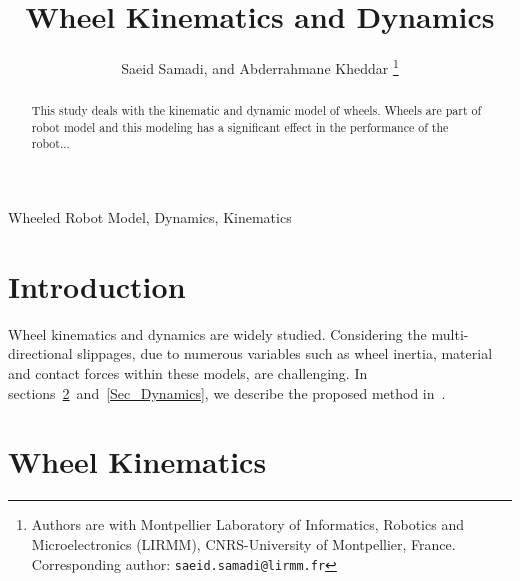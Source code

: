 \documentclass[letterpaper, 10pt, conference]{ieeeconf}
\title{\Large \bf
	Wheel Kinematics and Dynamics}
\author{Saeid Samadi, and Abderrahmane Kheddar
	\thanks{Authors are with Montpellier Laboratory of Informatics,
		Robotics and Microelectronics (LIRMM), CNRS-University of Montpellier, France.
		Corresponding author: {\tt\footnotesize saeid.samadi@lirmm.fr}}
}
\begin{document}
\maketitle
\thispagestyle{empty}
\pagestyle{empty}

\begin{abstract}
	This study deals with the kinematic and dynamic model of wheels. Wheels are part of robot model and this modeling has a significant effect in the performance of the robot...
\end{abstract}

\begin{keywords}
	Wheeled Robot Model, Dynamics, Kinematics
\end{keywords}

	

\section{Introduction} \label{Sec_Introduction}
Wheel kinematics and dynamics are widely studied. Considering the multi-directional slippages, due to numerous variables such as wheel inertia, material and contact forces within these models, are challenging.  In sections~\ref{Sec_Kinematics}~and~\ref{Sec_Dynamics}, we describe the proposed method in~\cite{Seegmiller2014thesis}.
\section{Wheel Kinematics} \label{Sec_Kinematics}
\end{document}
